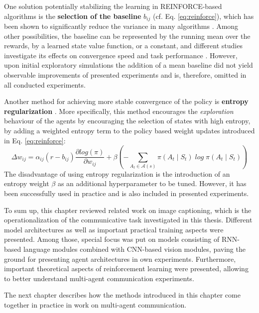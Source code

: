 One solution potentially stabilizing the learning in REINFORCE-based algorithms is the \textbf{selection of the baseline} $b_{ij}$ (cf. Eq. \ref{eq:reinforce}), which has been shown to significantly reduce the variance in many algorithms \parencite{sutton2018reinforcement}. 
Among other possibilities, the baseline can be represented by the running mean over the rewards, by a learned state value function, or a constant, and different studies investigate its effects on convergence speed and task performance \parencite{williams1992simple, greensmith2004variance}. However, upon initial exploratory simulations the addition of a mean baseline did not yield observable improvements of presented experiments and is, therefore, omitted in all conducted experiments. 

Another method for achieving more stable convergence of the policy is \textbf{entropy regularization} \parencite{williams1991function, mnih2016asynchronous}. More specifically, this method encourages the \textit{exploration} behaviour of the agents by encouraging the selection of states with high entropy, by adding a weighted entropy term to the policy based weight updates introduced in Eq. \ref{eq:reinforce}: 
\begin{equation}
\Delta w_{ij} = \alpha_{ij} (r - b_{ij}) \frac{\partial log(\pi)}{\partial w_{ij}} + \beta (- \sum_{A_t \in \mathcal{A}(s)} \pi(A_t \mid S_t) \; log \; \pi(A_t \mid S_t))
\end{equation}
The disadvantage of using entropy regularization is the introduction of an entropy weight $\beta$ as an additional hyperparameter to be tuned. However, it has been successfully used in practice and is also included in presented experiments.

To sum up, this chapter reviewed related work on image captioning, which is the operationalization of the communicative task investigated in this thesis. Different model architectures as well as important practical training aspects were presented. Among those, special focus was put on models consisting of RNN-based language modules combined with CNN-based vision modules, paving the ground for presenting agent architectures in own experiments.  
Furthermore, important theoretical aspects of reinforcement learning were presented, allowing to better understand multi-agent communication experiments. 

The next chapter describes how the methods introduced in this chapter come together in practice in work on multi-agent communication.
